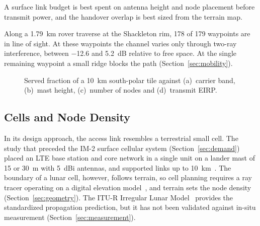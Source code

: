 \documentclass{IEEEoj}
\begin{document}
\begin{remark}
A surface link budget is best spent on antenna height and node placement before transmit power, and the handover overlap is best sized from the terrain map.
\end{remark}

Along a \SI{1.79}{km} rover traverse at the Shackleton rim, 178 of 179 waypoints are in line of sight. At these waypoints the channel varies only through two-ray interference, between \SI{-12.6}{} and \SI{+5.2}{dB} relative to free space. At the single remaining waypoint a small ridge blocks the path (Section~\ref{sec:mobility}).
\begin{figure}[!t]
\centering

\caption{Served fraction of a \SI{10}{km} south-polar tile against (a)~carrier band, (b)~mast height, (c)~number of nodes and (d)~transmit EIRP.}
\label{fig:coverage}
\end{figure}


\subsection{Cells and Node Density}
\label{sec:cells}
In its design approach, the access link resembles a terrestrial small cell. The study that preceded the IM-2 surface cellular system (Section~\ref{sec:demand}) placed an LTE base station and core network in a single unit on a lander mast of \SI{15}{} or \SI{30}{m} with \SI{5}{dBi} antennas, and supported links up to \SI{10}{km}~\cite{nokia_lunar_3gpp}. The boundary of a lunar cell, however, follows terrain, so cell planning requires a ray tracer operating on a digital elevation model~\cite{azami_terrain_aware,zhu_channel_ray}, and terrain sets the node density (Section~\ref{sec:geometry}). The ITU-R Irregular Lunar Model~\cite{itu_p2170} provides the standardized propagation prediction, but it has not been validated against in-situ measurement (Section~\ref{sec:measurement}).
\end{document}

